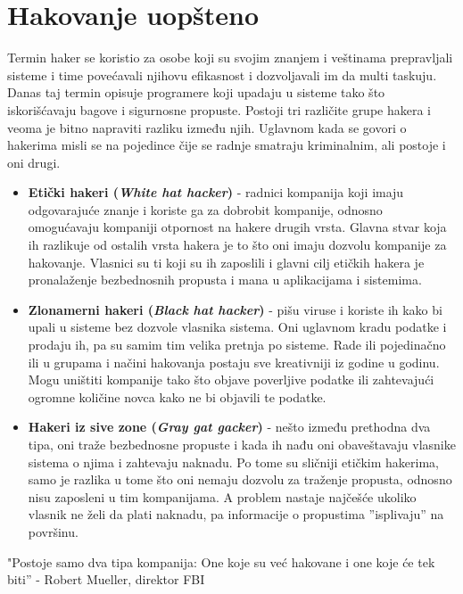 \documentclass[a4paper]{article}
\begin{document}
{\newpage

\section{Hakovanje uopšteno}
\label{sec:hakovanje}
Termin haker se koristio za osobe koji su svojim znanjem i veštinama prepravljali sisteme i time povećavali njihovu efikasnost i dozvoljavali im da multi taskuju. 
Danas taj termin opisuje programere koji upadaju u sisteme tako što iskorišćavaju bagove i sigurnosne propuste.
Postoji tri različite grupe hakera i veoma je bitno napraviti razliku između njih. Uglavnom kada se govori o hakerima misli se na pojedince čije se radnje smatraju kriminalnim, ali postoje i oni drugi.

\begin{itemize}
\item \textbf{Etički hakeri ({\em White hat hacker})} - radnici kompanija koji imaju odgovarajuće znanje i koriste ga za dobrobit kompanije, odnosno omogućavaju kompaniji otpornost na hakere drugih vrsta. Glavna stvar koja ih razlikuje od ostalih vrsta hakera je to što oni imaju dozvolu kompanije za hakovanje. Vlasnici su ti koji su ih zaposlili i glavni cilj etičkih hakera je pronalaženje bezbednosnih propusta i mana u aplikacijama i sistemima.
\item \textbf{Zlonamerni hakeri ({\em Black hat hacker})} - pišu viruse i koriste ih kako bi upali u sisteme bez dozvole vlasnika sistema. Oni uglavnom kradu podatke i prodaju ih, pa su samim tim velika pretnja po sisteme. Rade ili pojedinačno ili u grupama i načini hakovanja postaju sve kreativniji iz godine u godinu. Mogu uništiti kompanije tako što objave poverljive podatke ili zahtevajući ogromne količine novca kako ne bi objavili te podatke.
\item \textbf{Hakeri iz sive zone ({\em Gray gat gacker})} - nešto između prethodna dva tipa, oni traže bezbednosne propuste i kada ih nađu oni obaveštavaju vlasnike sistema o njima i zahtevaju naknadu. Po tome su sličniji etičkim hakerima, samo je razlika u tome što oni nemaju dozvolu za traženje propusta, odnosno nisu zaposleni u tim kompanijama. A problem nastaje najčešće ukoliko vlasnik ne želi da plati naknadu, pa informacije o propustima ''isplivaju'' na površinu.
\end{itemize} \cite{ethackandcybersec}

"Postoje samo dva tipa kompanija: One koje su već hakovane i one koje će tek biti'' - Robert Mueller, direktor FBI
\newpage

}
\end{document}
